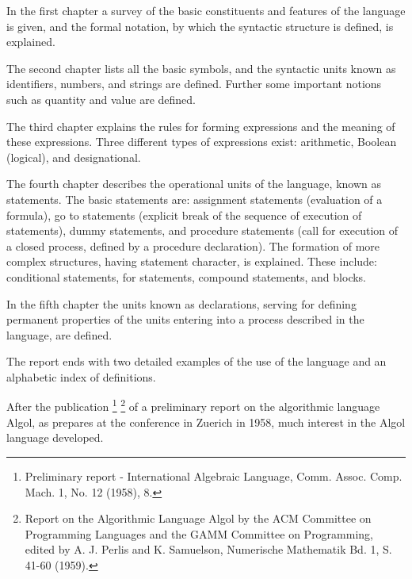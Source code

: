 \documentclass[a4paper,11pt]{article}
\begin{document}
In the first chapter a survey of the basic constituents and features
of the language is given, and the formal notation, by which the
syntactic structure is defined, is explained.

The second chapter lists all the basic symbols, and the syntactic
units known as identifiers, numbers, and strings are defined. Further
some important notions such as quantity and value are defined.

The third chapter explains the rules for forming expressions and the
meaning of these expressions. Three different types of expressions
exist: arithmetic, Boolean (logical), and designational.

The fourth chapter describes the operational units of the language,
known as statements. The basic statements are: assignment statements
(evaluation of a formula), go to statements (explicit break of the
sequence of execution of statements), dummy statements, and procedure
statements (call for execution of a closed process, defined by a
procedure declaration). The formation of more complex structures,
having statement character, is explained. These include: conditional
statements, for statements, compound statements, and blocks.

In the fifth chapter the units known as declarations, serving for
defining permanent properties of the units entering into a process
described in the language, are defined.

The report ends with two detailed examples of the use of the language
and an alphabetic index of definitions.






After the publication \footnote{Preliminary report - International
Algebraic Language, Comm.  Assoc. Comp. Mach. 1, No. 12 (1958), 8.}
\footnote{Report on the Algorithmic Language Algol by the ACM
Committee on Programming Languages and the GAMM Committee on
Programming, edited by A. J. Perlis and K. Samuelson, Numerische
Mathematik Bd. 1, S. 41-60 (1959).} of a preliminary report on the
algorithmic language Algol, as prepares at the conference in Zuerich
in 1958, much interest in the Algol language developed.
\end{document}
